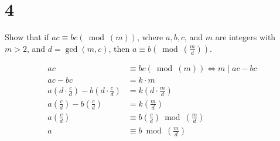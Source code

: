 \documentclass{article}
\begin{document}
\section{4}

Show that if $ ac \equiv bc(\bmod(m)) $, where $ a, b, c $, and $ m $ are integers with $ m > 2 $, and $ d = \gcd(m, c) $, then $ a \equiv b \left( \bmod \left( \frac{ m }{ d } \right) \right) $.

\begin{align*}
	ac                                                                                  & \equiv bc(\bmod(m)) \iff m \mid ac - bc                                         \\
	ac - bc                                                                             & = k \cdot m                                                                     \\
	a \left( d \cdot \frac{ c }{ d } \right) - b \left( d \cdot \frac{ c }{ d } \right) & = k \left( d \cdot \frac { m }{ d } \right)                                     \\
	a \left(  \frac{ c }{ d } \right) - b \left(  \frac{ c }{ d } \right)               & = k \left(  \frac { m }{ d } \right)                                            \\
	a \left(  \frac{ c }{ d } \right)                                                   & \equiv b \left(  \frac{ c }{ d } \right) \bmod \left(  \frac { m }{ d } \right) \\
	a                                                                                   & \equiv b  \bmod \left(  \frac { m }{ d } \right)
\end{align*}
\end{document}
